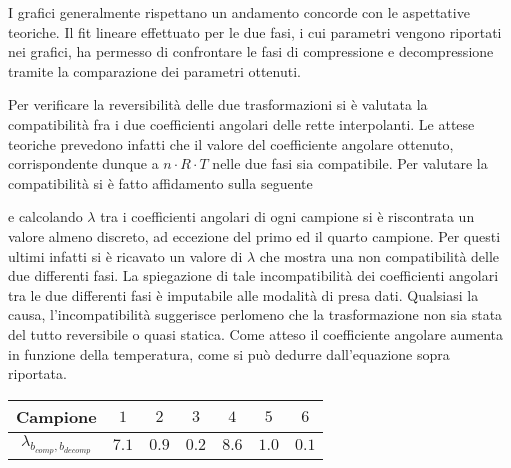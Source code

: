 \documentclass[a4paper,11pt,oneside]{article}
\begin{document}
I grafici generalmente rispettano un andamento concorde con le aspettative teoriche. Il fit lineare effettuato per le due fasi, i cui parametri vengono riportati nei grafici, ha permesso di confrontare le fasi di compressione e decompressione tramite la comparazione dei parametri ottenuti.

Per verificare la reversibilità delle due trasformazioni si è valutata la compatibilità fra i due coefficienti angolari delle rette interpolanti. Le attese teoriche prevedono infatti che il valore del coefficiente angolare ottenuto, corrispondente dunque a $n \cdot R \cdot T$ nelle due fasi sia compatibile. Per valutare la compatibilità si è fatto affidamento sulla seguente 

e calcolando $\lambda$ tra i coefficienti angolari di ogni campione si è riscontrata un valore almeno discreto, ad eccezione del primo ed il quarto campione. Per questi ultimi infatti si è ricavato un valore di $\lambda$ che mostra una non compatibilità delle due differenti fasi. La spiegazione di tale incompatibilità dei coefficienti angolari tra le due differenti fasi è imputabile alle modalità di presa dati. Qualsiasi la causa, l'incompatibilità suggerisce perlomeno che la trasformazione non sia stata del tutto reversibile o quasi statica. Come atteso il coefficiente angolare aumenta in funzione della temperatura, come si può dedurre dall'equazione sopra riportata.

\begin{table}[h!]
\centering
\begin{tabular}{|c|c|c|c|c|c|c|}
\hline
\textbf{Campione} & $1$ & $2$ & $3$ & $4$ & $5$ & $6$ \\ \hline
\rowcolor[rgb]{0.85,0.85,0.85}$\lambda_{b_{comp},b_{decomp}}$ & $7.1$ & $0.9$ & $0.2$ & $8.6$ & $1.0$ & $0.1$ \\ \hline
\end{tabular}
\end{table}
\end{document}
